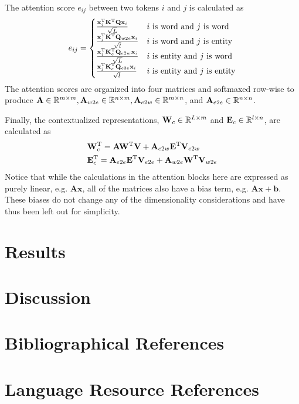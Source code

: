 \documentclass[10pt, a4paper]{article}
\begin{document}
The attention score $ e_{ij} $ between two tokens $ i $ and $ j $ is calculated as
\begin{equation*}
    e_{ij} = \begin{cases}
        \frac{\mathbf x_j^{\textup T}\mathbf K^{\textup T}\mathbf Q\mathbf x_i}{\sqrt{L}}&\text{$ i $ is word and $ j $ is word}\\
        \frac{\mathbf x_j^{\textup T}\mathbf K^{\textup T}\mathbf Q_{w2e}\mathbf x_i}{\sqrt{l}}&\text{$ i $ is word and $ j $ is entity}\\
        \frac{\mathbf x_j^{\textup T}\mathbf K_e^{\textup T}\mathbf Q_{e2w}\mathbf x_i}{\sqrt{L}}&\text{$ i $ is entity and $ j $ is word}\\
        \frac{\mathbf x_j^{\textup T}\mathbf K_e^{\textup T}\mathbf Q_{e2e}\mathbf x_i}{\sqrt{l}}&\text{$ i $ is entity and $ j $ is entity}
    \end{cases}
\end{equation*}
The attention scores are organized into four matrices and softmaxed row-wise to produce $ \mathbf A\in\mathbb R^{m\times m}, \mathbf A_{w2e}\in\mathbb R^{n\times m}, \mathbf A_{e2w}\in\mathbb R^{m\times n} $, and $ \mathbf A_{e2e}\in\mathbb R^{n\times n} $.

Finally, the contextualized representations, $ \mathbf W_{c}\in\mathbb R^{L\times m} $ and $ \mathbf E_{c}\in\mathbb R^{l\times n} $, are calculated as
\begin{align*}
    &\mathbf W_c^{\textup T} = \mathbf A\mathbf W^{\textup T}\mathbf V
        + \mathbf A_{e2w}\mathbf E^{\textup T}\mathbf V_{e2w} \\
        &\mathbf E_c^{\textup T} = \mathbf A_{e2e}\mathbf E^{\textup T}\mathbf V_{e2e}
        + \mathbf A_{w2e}\mathbf W^{\textup T}\mathbf V_{w2e}
\end{align*}
Notice that while the calculations in the attention blocks here are expressed as purely linear, e.g. $ \mathbf A\mathbf x $, all of the matrices also have a bias term, e.g. $ \mathbf A\mathbf x+\mathbf b $.
These biases do not change any of the dimensionality considerations and have thus been left out for simplicity.

\section{Results}

\section{Discussion}

\section{Bibliographical References}\label{reference}




\section{Language Resource References}
\label{lr:ref}
\end{document}
